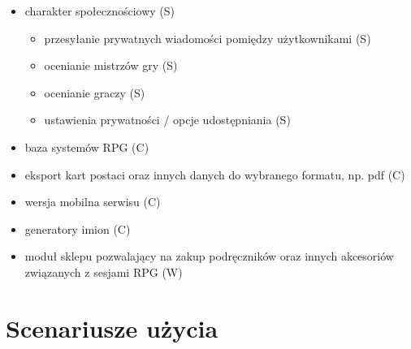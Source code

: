 \begin{itemize}
\item charakter społecznościowy (S)
	\begin{itemize}
	\item przesyłanie prywatnych wiadomości pomiędzy użytkownikami (S)
	\item ocenianie mistrzów gry (S)
	\item ocenianie graczy (S)
	\item ustawienia prywatności / opcje udostępniania (S)
	\end{itemize}
\item baza systemów RPG (C)
\item eksport kart postaci oraz innych danych do wybranego formatu, np. pdf (C)
\item wersja mobilna serwisu (C)
\item generatory imion (C)
\item moduł sklepu pozwalający na zakup podręczników oraz innych akcesoriów związanych z sesjami RPG (W)
\end{itemize}


\section{Scenariusze użycia}
\label{sec:scenariusze}

\renewcommand{\labelenumi}{\arabic{enumi}.} 
\renewcommand{\labelenumii}{\arabic{enumi}.\arabic{enumii}.}
\renewcommand{\labelenumiii}{\arabic{enumi}.\arabic{enumii}.\arabic{enumiii}.}

